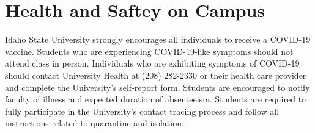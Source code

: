 \documentclass[11pt]{article}\usepackage[]{graphicx}\usepackage[]{xcolor}
\begin{document}
\section{Health and Saftey on Campus}

Idaho State University strongly encourages all individuals to receive a COVID-19 vaccine.
Students who are experiencing COVID-19-like symptoms should not attend class in person.
Individuals who are exhibiting symptoms of COVID-19 should contact University Health at (208) 282-2330 or their health care provider and complete the University’s self-report form.
Students are encouraged to notify faculty of illness and expected duration of absenteeism.
Students are required to fully participate in the University’s contact tracing process and follow all instructions related to quarantine and isolation.
\end{document}
